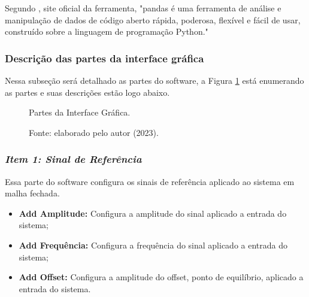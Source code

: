 Segundo \cite{pandas}, site oficial da ferramenta, "pandas é uma ferramenta de análise e manipulação de dados de código aberto rápida, poderosa, flexível e fácil de usar, construído sobre a linguagem de programação Python."


\subsubsection{Descrição das partes da interface gráfica}

Nessa subseção será detalhado as partes do software, a Figura \ref{fig3:image_15} está enumerando as partes e suas descrições estão logo abaixo.

\begin{figure}[!h]
	\centering
	\caption{Partes da Interface Gráfica.}
	\caption*{Fonte: elaborado pelo autor (2023).}
	\label{fig3:image_15}
\end{figure}



\subsubsection*{\textit{Item 1: Sinal de Referência}}

Essa parte do software configura os sinais de referência aplicado ao sistema em malha fechada.


\begin{itemize}
        \setlength{\itemsep}{-2pt}
	\item  \textbf{Add Amplitude:} Configura a amplitude do sinal aplicado a entrada do sistema;
        \item  \textbf{Add Frequência:} Configura a frequência do sinal aplicado a entrada do sistema;
        \item  \textbf{Add Offset:} Configura a amplitude do offset, ponto de equilíbrio, aplicado a entrada do sistema.
\end{itemize}


